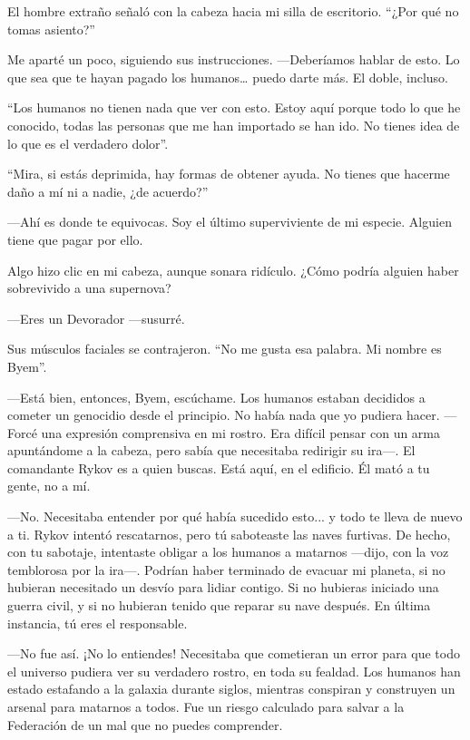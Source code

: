 El hombre extraño señaló con la cabeza hacia mi silla de escritorio. ``¿Por qué no tomas asiento?''

Me aparté un poco, siguiendo sus instrucciones. —Deberíamos hablar de esto. Lo que sea que te hayan pagado los humanos… puedo darte más. El doble, incluso.

``Los humanos no tienen nada que ver con esto. Estoy aquí porque todo lo que he conocido, todas las personas que me han importado se han ido. No tienes idea de lo que es el verdadero dolor''.

``Mira, si estás deprimida, hay formas de obtener ayuda. No tienes que hacerme daño a mí ni a nadie, ¿de acuerdo?''

—Ahí es donde te equivocas. Soy el último superviviente de mi especie. Alguien tiene que pagar por ello.

Algo hizo clic en mi cabeza, aunque sonara ridículo. ¿Cómo podría alguien haber sobrevivido a una supernova?

—Eres un Devorador —susurré.

Sus músculos faciales se contrajeron. ``No me gusta esa palabra. Mi nombre es Byem''.

—Está bien, entonces, Byem, escúchame. Los humanos estaban decididos a cometer un genocidio desde el principio. No había nada que yo pudiera hacer. —Forcé una expresión comprensiva en mi rostro. Era difícil pensar con un arma apuntándome a la cabeza, pero sabía que necesitaba redirigir su ira—. El comandante Rykov es a quien buscas. Está aquí, en el edificio. Él mató a tu gente, no a mí.

—No. Necesitaba entender por qué había sucedido esto... y todo te lleva de nuevo a ti. Rykov intentó rescatarnos, pero tú saboteaste las naves furtivas. De hecho, con tu sabotaje, intentaste obligar a los humanos a matarnos —dijo, con la voz temblorosa por la ira—. Podrían haber terminado de evacuar mi planeta, si no hubieran necesitado un desvío para lidiar contigo. Si no hubieras iniciado una guerra civil, y si no hubieran tenido que reparar su nave después. En última instancia, tú eres el responsable.

—No fue así. ¡No lo entiendes! Necesitaba que cometieran un error para que todo el universo pudiera ver su verdadero rostro, en toda su fealdad. Los humanos han estado estafando a la galaxia durante siglos, mientras conspiran y construyen un arsenal para matarnos a todos. Fue un riesgo calculado para salvar a la Federación de un mal que no puedes comprender.

